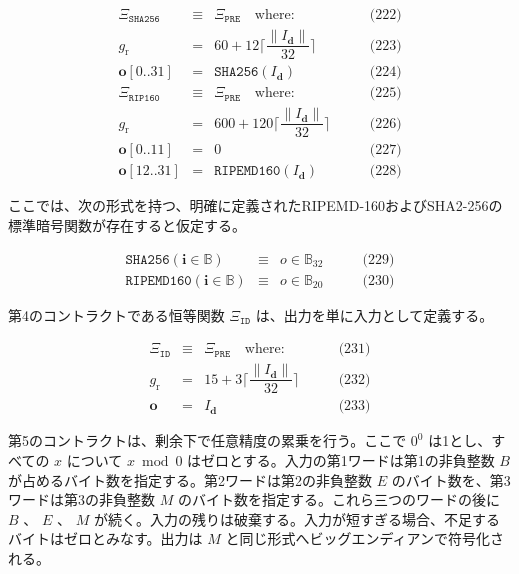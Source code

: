 \documentclass[
]{ltjsarticle}
\begin{document}
\[\begin{aligned}
\Xi_{\mathtt{SHA256}} &\equiv& \Xi_{\mathtt{PRE}} \quad \text{where:} & \qquad \text{(222)} \\
g_{\mathrm{r}} &=& 60 + 12\Big\lceil \dfrac{\lVert I_{\mathbf{d}} \rVert}{32} \Big\rceil & \qquad \text{(223)} \\
\mathbf{o}[0..31] &=& \mathtt{SHA256}(I_{\mathbf{d}}) & \qquad \text{(224)} \\
\Xi_{\mathtt{RIP160}} &\equiv& \Xi_{\mathtt{PRE}} \quad \text{where:} & \qquad \text{(225)} \\
g_{\mathrm{r}} &=& 600 + 120\Big\lceil \dfrac{\lVert I_{\mathbf{d}} \rVert}{32} \Big\rceil & \qquad \text{(226)} \\
\mathbf{o}[0..11] &=& 0 & \qquad \text{(227)} \\
\mathbf{o}[12..31] &=& \mathtt{RIPEMD160}(I_{\mathbf{d}}) & \qquad \text{(228)}
\end{aligned}\]

ここでは、次の形式を持つ、明確に定義されたRIPEMD-160およびSHA2-256の標準暗号関数が存在すると仮定する。

\protect\hypertarget{eq-229}{}{}\protect\hypertarget{eq-230}{}{}

\[\begin{aligned}
\mathtt{SHA256}(\mathbf{i} \in \mathbb{B}) & \equiv & o \in \mathbb{B}_{32} & \qquad \text{(229)} \\
\mathtt{RIPEMD160}(\mathbf{i} \in \mathbb{B}) & \equiv & o \in \mathbb{B}_{20} & \qquad \text{(230)}
\end{aligned}\]

第4のコントラクトである恒等関数 \(\Xi_{\mathtt{ID}}\)
は、出力を単に入力として定義する。

\protect\hypertarget{eq-231}{}{}\protect\hypertarget{eq-232}{}{}\protect\hypertarget{eq-233}{}{}

\[\begin{aligned}
\Xi_{\mathtt{ID}} &\equiv& \Xi_{\mathtt{PRE}} \quad \text{where:} & \qquad \text{(231)} \\
g_{\mathrm{r}} &=& 15 + 3\Big\lceil \dfrac{\lVert I_{\mathbf{d}} \rVert}{32} \Big\rceil & \qquad \text{(232)} \\
\mathbf{o} &=& I_{\mathbf{d}} & \qquad \text{(233)}
\end{aligned}\]

第5のコントラクトは、剰余下で任意精度の累乗を行う。ここで \(0 ^ 0\)
は1とし、すべての \(x\) について \(x \bmod 0\)
はゼロとする。入力の第1ワードは第1の非負整数 \(B\)
が占めるバイト数を指定する。第2ワードは第2の非負整数 \(E\)
のバイト数を、第3ワードは第3の非負整数 \(M\)
のバイト数を指定する。これら三つのワードの後に \(B\) 、 \(E\) 、 \(M\)
が続く。入力の残りは破棄する。入力が短すぎる場合、不足するバイトはゼロとみなす。出力は
\(M\) と同じ形式へビッグエンディアンで符号化される。
\end{document}
